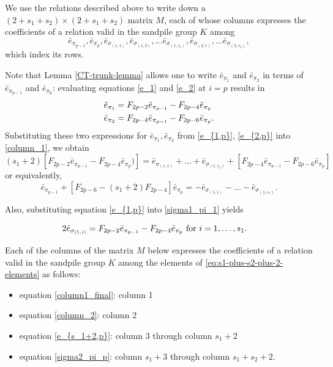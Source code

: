 \documentclass[10pt,reqno]{amsart}
\begin{document}
We use the  relations described above to 
write down a $(2+s_1+s_2) \times(2+s_1+s_2)$ matrix $M$, each of whose columns expresses the coefficients of a relation valid in the sandpile group $K$ among
\begin{equation}
\label{eq:s1-plus-s2-plus-2-elements}
\bar{e}_{\pi_{p-1}},
\bar{e}_{\pi_p},
\bar{e}_{\sigma_{(1,1)}},
\bar{e}_{\sigma_{(1,2)}},
\ldots
\bar{e}_{\sigma_{(1,s_1)}},
\bar{e}_{\sigma_{(2,1)}},
\ldots
\bar{e}_{\sigma_{(2,s_2)}},
\end{equation}
which index its rows. 

Note that Lemma \ref{CT-trunk-lemma} allows one to write  $\bar{e}_{\pi_{1}}$ and $\bar{e}_{\pi_{2}}$ in terms of $\bar{e}_{\pi_{p-1}}$ and $\bar{e}_{\pi_{p}}$:
evaluating equations \eqref{e_1} and \eqref{e_2} at $i=p$
results in 
\begin{align}   
\bar{e}_{\pi_1}
&= 
F_{2p-2} \bar{e}_{\pi_{p-1}}-F_{2p-4}\bar{e}_{\pi_{p}} \label{e_{1,p}}\\
\bar{e}_{\pi_2}
&= 
F_{2p-4} \bar{e}_{\pi_{p-1}}-F_{2p-6}\bar{e}_{\pi_{p}}\label{e_{2,p}} . 
\end{align}
Substituting these two expressions for 
$
\bar{e}_{\pi_1},
\bar{e}_{\pi_2}
$
from
\eqref{e_{1,p}}, \eqref{e_{2,p}}
into \eqref{column_1}, we obtain
$$
 (s_1+2)[F_{2p-2} \bar{e}_{\pi_{p-1}}-F_{2p-4}\bar{e}_{\pi_{p}} )]
 = \bar{e}_{\sigma_{(1,1)}}+
\ldots
+\bar{e}_{\sigma_{(1,s_1)}}+ [F_{2p-4} \bar{e}_{\pi_{p-1}}-F_{2p-6} \bar{e}_{\pi_{p}}]
$$
or equivalently,
\begin{equation}
[(s_1+2) F_{2p-2} - F_{2p-4}]\bar{e}_{\pi_{p-1}} +  [F_{2p-6} - (s_1+2)F_{2p-4}]\bar{e}_{\pi_{p}} 
= -\bar{e}_{\sigma_{(1,1)}}
-\ldots
-\bar{e}_{\sigma_{(1,s_1)}} \label{column1_final}.
\end{equation}

Also, substituting equation \eqref{e_{1,p}} into \eqref{sigma1_pi_1} yields

\begin{align}
2\bar{e}_{\sigma_{(1,i)}} &= F_{2p-2} \bar{e}_{\pi_{p-1}}-F_{2p-4}\bar{e}_{\pi_{p}} \label{e_{s_1+2,p}}\text{ for }i = 1, \dots, s_1.
\end{align}

Each of the columns of the matrix $M$ below expresses the coefficients of a relation valid in the sandpile group $K$ among the elements of \eqref{eq:s1-plus-s2-plus-2-elements} as follows:
\begin{itemize}

    \item equation \eqref{column1_final}: column 1 
    \item equation \eqref{column_2}: column 2
    \item  equation \eqref{e_{s_1+2,p}}: column 3 through  column $s_1+2$
    \item equation \eqref{sigma2_pi_p}: column $s_1+3$ through column $s_1+s_2+2$. 
\end{itemize}
\end{document}
